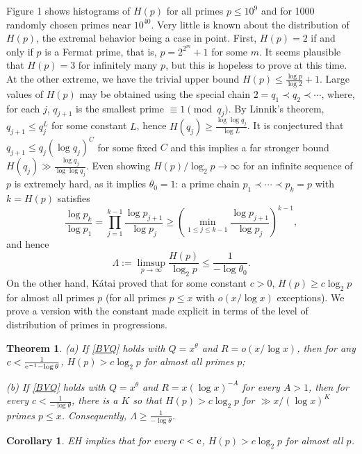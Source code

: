 \documentclass[12pt]{amsart}
\theoremstyle{remark}
\theoremstyle{plain}
\newtheorem{thm}{Theorem}
\newtheorem{cor}{Corollary}
\numberwithin{equation}{section}
\newcommand{\be}{\begin{equation}}
\newcommand{\ee}{\end{equation}}
\renewcommand{\th}{\ensuremath{\theta}}
\renewcommand{\(}{\left(}
\renewcommand{\)}{\right)}
\newcommand{\er}{{\rm e}}  %
\renewcommand{\le}{\leqslant}
\renewcommand{\ge}{\geqslant}
\begin{document}
Figure 1 shows histograms of $H(p)$ for all primes
$p\le 10^9$ and for 1000 randomly chosen primes near $10^{40}$.
Very little is known about the distribution of $H(p)$,
the extremal behavior being a case in point.
First, $H(p)=2$ if and only if $p$ is a Fermat prime, that is,
$p=2^{2^m}+1$ for some $m$.  It seems plausible that $H(p)=3$ for
infinitely many $p$, but this is hopeless to prove at this time.
At the other extreme, we have the trivial upper bound $H(p)\le \frac{\log p}
{\log 2}+1$.  Large values of $H(p)$ may be obtained using
the special chain $2=q_1 \prec q_2 \prec \cdots$,
where, for each $j$, $q_{j+1}$ is the smallest prime $\equiv 1\pmod{q_j}$.
By Linnik's theorem, $q_{j+1}\le q_j^L$ for some constant $L$, hence
$H(q_j) \ge \frac{\log\log q_j}{\log L}$.  It is conjectured
that $q_{j+1} \le q_j (\log q_j)^C$ for some fixed $C$ and this implies
a far stronger bound $H(q_j) \gg \frac{\log q_j}{\log\log q_j}$. 
Even showing $H(p)/\log_2 p \to \infty$ for an infinite sequence of $p$
is extremely hard, as it implies $\th_0=1$:
a prime chain $p_1 \prec \cdots \prec p_k=p$ with $k=H(p)$ satisfies
\[
 \frac{\log p_k}{\log p_1} = \prod_{j=1}^{k-1}
\frac{\log p_{j+1}}{\log p_j} \ge \( \min_{1\le j\le k-1} 
\frac{\log p_{j+1}}{\log p_j} \)^{k-1},
\]
 and hence 
\be\label{Htheta}
\Lambda := \limsup_{p\to\infty} \frac{H(p)}{\log_2 p} \le \frac{1}{-\log \th_0}.
\ee
On the other hand,
K\'atai \cite{Ka1} proved that for some 
constant $c>0$, $H(p)\ge c\log_2 p$ for almost all primes $p$ (for all primes
$p\le x$ with $o(x/\log x)$ exceptions).
We prove a version with the constant made explicit in terms of 
the level of distribution of primes in progressions.

\begin{thm}\label{Prattlower}
 (a) If \eqref{BVQ} holds with $Q=x^{\th}$ and $R=o(x/\log x)$, then
for any $c<\frac{1}{\er^{-1}-\log\th}$, $H(p)>c\log_2 p$ for almost all 
primes $p$;

(b) If \eqref{BVQ} holds with $Q=x^{\th}$ and $R=x(\log x)^{-A}$
for every $A>1$,
then for every $c<\frac{1}{-\log \th}$, there is a $K$ so that $H(p)>c\log_2 p$ for $\gg x/(\log x)^K$ primes $p\le x$.  Consequently, $\Lambda
\ge \frac{1}{-\log\th}$.
\end{thm}

\begin{cor}\label{HEH}
EH implies that for every $c<\er$, $H(p)>c\log_2 p$ for almost all $p$.
\end{cor}
\end{document}
